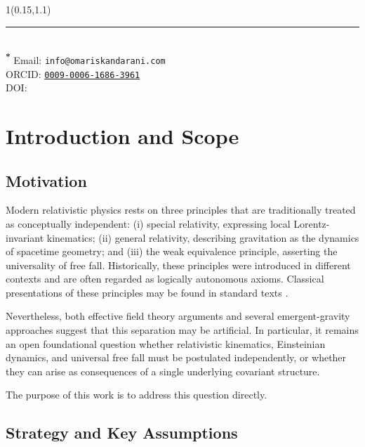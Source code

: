 \documentclass[11pt]{article}
\begin{document}
    
    \begin{textblock*}{1\textwidth}(0.15\textwidth,1.1\textheight)\raggedright\footnotesize\renewcommand{\arraystretch}{1.0} \noindent\rule{\textwidth}{0.4pt}\\[0.5em]
        \textsuperscript{\textbf{*}} Email: \texttt{info@omariskandarani.com}\\
        ORCID: \texttt{\href{https://orcid.org/0009-0006-1686-3961}{0009-0006-1686-3961}}\\
        DOI: \href{https://doi.org/\paperdoi}{\paperdoi}
    \end{textblock*}

    \section{Introduction and Scope}

        \subsection{Motivation}

            Modern relativistic physics rests on three principles that are traditionally
            treated as conceptually independent:
            (i) special relativity, expressing local Lorentz-invariant kinematics;
            (ii) general relativity, describing gravitation as the dynamics of spacetime
            geometry; and
            (iii) the weak equivalence principle, asserting the universality of free fall.
            Historically, these principles were introduced in different contexts and are
            often regarded as logically autonomous axioms.
            Classical presentations of these principles may be found in standard texts
            \cite{einstein1905,einstein1915,misnerthorne_wheeler1973}.

            Nevertheless, both effective field theory arguments and several emergent-gravity
            approaches suggest that this separation may be artificial.
            In particular, it remains an open foundational question whether relativistic
            kinematics, Einsteinian dynamics, and universal free fall must be postulated
            independently, or whether they can arise as consequences of a single underlying
            covariant structure.

            The purpose of this work is to address this question directly.

        \subsection{Strategy and Key Assumptions}
\end{document}
